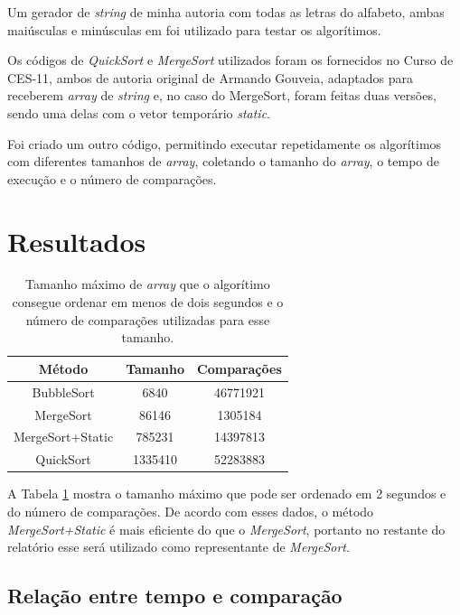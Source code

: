 \documentclass[12pt,a4paper,oneside]{article}
\begin{document}
\quad Um gerador de \textit{string} de minha autoria com todas as letras do alfabeto, ambas maiúsculas e minúsculas em foi utilizado para testar os algorítimos.

\quad Os códigos de \textit{QuickSort} e \textit{MergeSort} utilizados foram os fornecidos no Curso de CES-11, ambos de autoria original de Armando Gouveia, adaptados para receberem \textit{array} de \textit{string} e, no caso do MergeSort, foram feitas duas versões, sendo uma delas com o vetor temporário \textit{static}.

\quad Foi criado um outro código, permitindo executar repetidamente os algorítimos com diferentes tamanhos de \textit{array}, coletando o tamanho do \textit{array}, o tempo de execução e o número de comparações.

\section{Resultados}

\begin{table}[H]
\caption{Tamanho máximo de \textit{array} que o algorítimo consegue ordenar em menos de dois segundos e o número de comparações utilizadas para esse tamanho.}
\begin{center}
\begin{tabular}{|c|c c|}
\hline
Método			& Tamanho	& Comparações	\\
\hline
BubbleSort		& 6840		& 46771921			\\
MergeSort		& 86146	& 1305184			\\
MergeSort+Static	& 785231	& 14397813			\\
QuickSort		& 1335410	& 52283883			\\
\hline
\end{tabular}
\label{tab:tmax}
\end{center}
\end{table}

\quad A Tabela \ref{tab:tmax} mostra o tamanho máximo que pode ser ordenado em 2 segundos e do número de comparações. De acordo com esses dados, o método \textit{MergeSort+Static} é mais eficiente do que o \textit{MergeSort}, portanto no restante do relatório esse será utilizado como representante de \textit{MergeSort}.

\subsection{Relação entre tempo e comparação}
\end{document}
